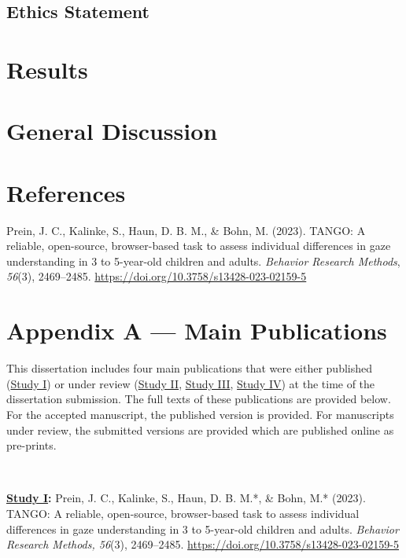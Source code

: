\documentclass[
]{scrbook}
\newlength{\cslhangindent}
\newenvironment{CSLReferences}[2] %
 {\begin{list}{}{%
  \setlength{\itemindent}{0pt}
  \setlength{\leftmargin}{0pt}
  \setlength{\parsep}{0pt}
  \ifodd #1
   \setlength{\leftmargin}{\cslhangindent}
   \setlength{\itemindent}{-1\cslhangindent}
  \fi
  \setlength{\itemsep}{#2\baselineskip}}}
 {\end{list}}
\begin{document}
\section{Ethics Statement}\label{ethics-statement}

\chapter{Results}\label{results}

\chapter{General Discussion}\label{discussion}

\backmatter

\chapter{References}\label{references}

\label{refs}
\begin{CSLReferences}{1}{0}
Prein, J. C., Kalinke, S., Haun, D. B. M., \& Bohn, M. (2023). {TANGO}: {A} reliable, open-source, browser-based task to assess individual differences in gaze understanding in 3 to 5-year-old children and adults. \emph{Behavior Research Methods}, \emph{56}(3), 2469--2485. \url{https://doi.org/10.3758/s13428-023-02159-5}

\end{CSLReferences}

\chapter{Appendix A --- Main Publications}\label{appendixA}

This dissertation includes four main publications that were either published (\hyperref[studyI]{Study I}) or under review (\hyperref[studyII]{Study II}, \hyperref[studyIII]{Study III}, \hyperref[studyIV]{Study IV}) at the time of the dissertation submission. The full texts of these publications are provided below. For the accepted manuscript, the published version is provided. For manuscripts under review, the submitted versions are provided which are published online as pre-prints.

~

\textbf{\hyperref[studyI]{Study I}:} Prein, J. C., Kalinke, S., Haun, D. B. M.*, \& Bohn, M.* (2023). TANGO: A reliable, open-source, browser-based task to assess individual differences in gaze understanding in 3 to 5-year-old children and adults. \emph{Behavior Research Methods, 56}(3), 2469--2485. \url{https://doi.org/10.3758/s13428-023-02159-5}
\end{document}
